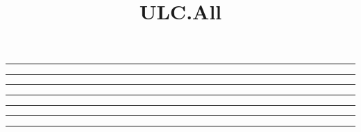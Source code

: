 \documentclass[a4paper]{article}
\title{ULC.All}
\begin{document}
\maketitle
%



\bigskip\hrule\bigskip



\bigskip\hrule\bigskip



\bigskip\hrule\bigskip

\pagebreak



\bigskip\hrule\bigskip



\bigskip\hrule\bigskip



\bigskip\hrule\bigskip

\pagebreak



\bigskip\hrule\bigskip
\end{document}
